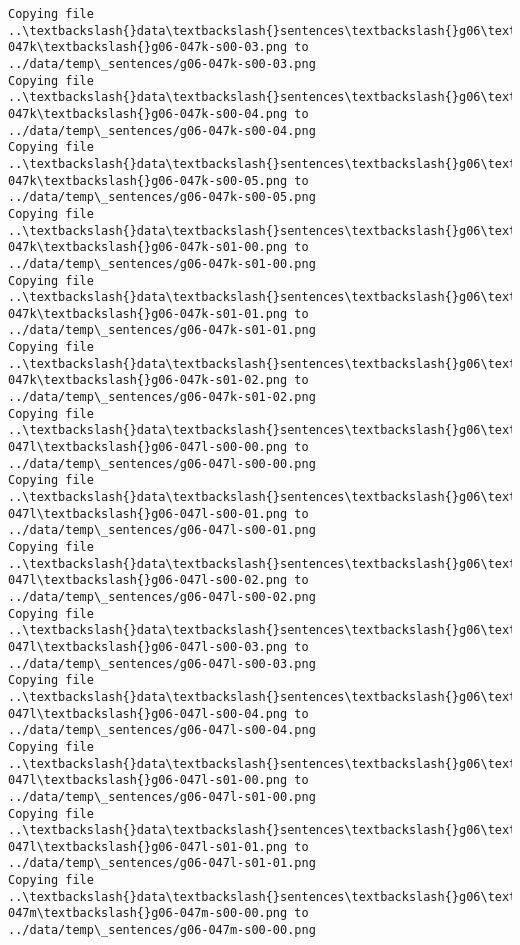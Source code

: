 \documentclass[11pt]{article}
\begin{document}
\begin{Verbatim}[commandchars=\\\{\}]
Copying file ..\textbackslash{}data\textbackslash{}sentences\textbackslash{}g06\textbackslash{}g06-047k\textbackslash{}g06-047k-s00-03.png to
../data/temp\_sentences/g06-047k-s00-03.png
Copying file ..\textbackslash{}data\textbackslash{}sentences\textbackslash{}g06\textbackslash{}g06-047k\textbackslash{}g06-047k-s00-04.png to
../data/temp\_sentences/g06-047k-s00-04.png
Copying file ..\textbackslash{}data\textbackslash{}sentences\textbackslash{}g06\textbackslash{}g06-047k\textbackslash{}g06-047k-s00-05.png to
../data/temp\_sentences/g06-047k-s00-05.png
Copying file ..\textbackslash{}data\textbackslash{}sentences\textbackslash{}g06\textbackslash{}g06-047k\textbackslash{}g06-047k-s01-00.png to
../data/temp\_sentences/g06-047k-s01-00.png
Copying file ..\textbackslash{}data\textbackslash{}sentences\textbackslash{}g06\textbackslash{}g06-047k\textbackslash{}g06-047k-s01-01.png to
../data/temp\_sentences/g06-047k-s01-01.png
Copying file ..\textbackslash{}data\textbackslash{}sentences\textbackslash{}g06\textbackslash{}g06-047k\textbackslash{}g06-047k-s01-02.png to
../data/temp\_sentences/g06-047k-s01-02.png
Copying file ..\textbackslash{}data\textbackslash{}sentences\textbackslash{}g06\textbackslash{}g06-047l\textbackslash{}g06-047l-s00-00.png to
../data/temp\_sentences/g06-047l-s00-00.png
Copying file ..\textbackslash{}data\textbackslash{}sentences\textbackslash{}g06\textbackslash{}g06-047l\textbackslash{}g06-047l-s00-01.png to
../data/temp\_sentences/g06-047l-s00-01.png
Copying file ..\textbackslash{}data\textbackslash{}sentences\textbackslash{}g06\textbackslash{}g06-047l\textbackslash{}g06-047l-s00-02.png to
../data/temp\_sentences/g06-047l-s00-02.png
Copying file ..\textbackslash{}data\textbackslash{}sentences\textbackslash{}g06\textbackslash{}g06-047l\textbackslash{}g06-047l-s00-03.png to
../data/temp\_sentences/g06-047l-s00-03.png
Copying file ..\textbackslash{}data\textbackslash{}sentences\textbackslash{}g06\textbackslash{}g06-047l\textbackslash{}g06-047l-s00-04.png to
../data/temp\_sentences/g06-047l-s00-04.png
Copying file ..\textbackslash{}data\textbackslash{}sentences\textbackslash{}g06\textbackslash{}g06-047l\textbackslash{}g06-047l-s01-00.png to
../data/temp\_sentences/g06-047l-s01-00.png
Copying file ..\textbackslash{}data\textbackslash{}sentences\textbackslash{}g06\textbackslash{}g06-047l\textbackslash{}g06-047l-s01-01.png to
../data/temp\_sentences/g06-047l-s01-01.png
Copying file ..\textbackslash{}data\textbackslash{}sentences\textbackslash{}g06\textbackslash{}g06-047m\textbackslash{}g06-047m-s00-00.png to
../data/temp\_sentences/g06-047m-s00-00.png

\end{Verbatim}
\end{document}
